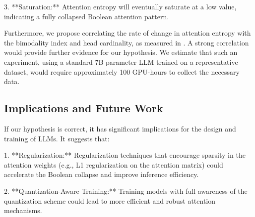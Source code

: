 3.  **Saturation:**  Attention entropy will eventually saturate at a low value, indicating a fully collapsed Boolean attention pattern.













Furthermore, we propose correlating the rate of change in attention entropy with the bimodality index and head cardinality, as measured in \cite{mimo2024empirical}.  A strong correlation would provide further evidence for our hypothesis.  We estimate that such an experiment, using a standard 7B parameter LLM trained on a representative dataset, would require approximately 100 GPU-hours to collect the necessary data.













\subsection{Implications and Future Work}













If our hypothesis is correct, it has significant implications for the design and training of LLMs.  It suggests that:













1.  **Regularization:**  Regularization techniques that encourage sparsity in the attention weights (e.g., L1 regularization on the attention matrix) could accelerate the Boolean collapse and improve inference efficiency.






2.  **Quantization-Aware Training:**  Training models with full awareness of the quantization scheme could lead to more efficient and robust attention mechanisms.






